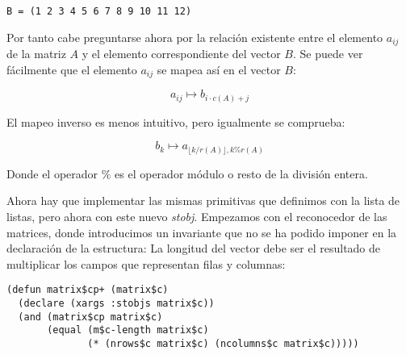 \documentclass[a4paper,10pt]{article}
\begin{document}
\par \vspace{10pt}

\begin{lstlisting}[language=clips]
B = (1 2 3 4 5 6 7 8 9 10 11 12)
\end{lstlisting}

\par \vspace{10pt}

Por tanto cabe preguntarse ahora por la relación existente entre el elemento $a_{ij}$ de la matriz $A$ y el elemento correspondiente del vector $B$. Se puede ver fácilmente que el elemento $a_{ij}$ se mapea así en el vector $B$:

\LARGE
$$
a_{ij} \mapsto b_{i\cdot c(A) + j}
$$
\normalsize

\par \vspace{10pt}

El mapeo inverso es menos intuitivo, pero igualmente se comprueba:

\LARGE
$$
b_k \mapsto a_{\lfloor k/r(A)\rfloor, k \% r(A)}
$$
\normalsize

\par \vspace{10pt}

Donde el operador $\%$ es el operador módulo o resto de la división entera.

\par \vspace{10pt}

Ahora hay que implementar las mismas primitivas que definimos con la lista de listas, pero ahora con este nuevo \emph{stobj}. Empezamos con el reconocedor de las matrices, donde introducimos un invariante que no se ha podido imponer en la declaración de la estructura: La longitud del vector debe ser el resultado de multiplicar los campos que representan filas y columnas:

\par \vspace{10pt}

\begin{lstlisting}[language=clips]
(defun matrix$cp+ (matrix$c)
  (declare (xargs :stobjs matrix$c))
  (and (matrix$cp matrix$c)
       (equal (m$c-length matrix$c)
              (* (nrows$c matrix$c) (ncolumns$c matrix$c)))))
\end{lstlisting}

\par \vspace{10pt}
\end{document}

